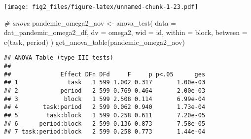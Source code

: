 \documentclass[
]{article}
\newenvironment{Shaded}{\begin{snugshade}}{\end{snugshade}}
\newcommand{\AttributeTok}[1]{\textcolor[rgb]{0.77,0.63,0.00}{#1}}
\newcommand{\CommentTok}[1]{\textcolor[rgb]{0.56,0.35,0.01}{\textit{#1}}}
\newcommand{\FunctionTok}[1]{\textcolor[rgb]{0.00,0.00,0.00}{#1}}
\newcommand{\NormalTok}[1]{#1}
\newcommand{\OtherTok}[1]{\textcolor[rgb]{0.56,0.35,0.01}{#1}}
\begin{document}
\texttt{[image: fig2\_files/figure-latex/unnamed-chunk-1-23.pdf]}

\begin{Shaded}
\begin{Highlighting}[]
\CommentTok{\# anova}
\NormalTok{pandemic\_omega2\_aov }\OtherTok{\textless{}{-}} \FunctionTok{anova\_test}\NormalTok{(}
  \AttributeTok{data =}\NormalTok{ dat\_pandemic\_omega2\_df, }\AttributeTok{dv =}\NormalTok{ omega2, }\AttributeTok{wid =}\NormalTok{ id,}
  \AttributeTok{within =}\NormalTok{ block, }\AttributeTok{between =} \FunctionTok{c}\NormalTok{(task, period)}
\NormalTok{)}
\FunctionTok{get\_anova\_table}\NormalTok{(pandemic\_omega2\_aov)}
\end{Highlighting}
\end{Shaded}

\begin{verbatim}
## ANOVA Table (type III tests)
## 
##              Effect DFn DFd     F     p p<.05      ges
## 1              task   1 599 1.002 0.317       1.00e-03
## 2            period   2 599 0.769 0.464       2.00e-03
## 3             block   1 599 2.508 0.114       6.99e-04
## 4       task:period   2 599 0.062 0.940       1.73e-04
## 5        task:block   1 599 0.258 0.611       7.20e-05
## 6      period:block   2 599 0.136 0.873       7.58e-05
## 7 task:period:block   2 599 0.258 0.773       1.44e-04
\end{verbatim}
\end{document}

